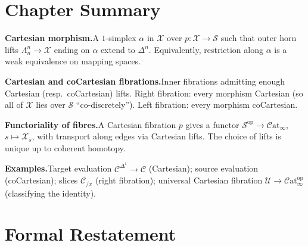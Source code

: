 \section*{Chapter Summary}

\begin{summarybox}
\textbf{Cartesian morphism.}\quad A $1$-simplex $\alpha$ in $\mathcal{X}$
over $p : \mathcal{X} \to \mathcal{S}$ such that outer horn lifts
$\Lambda^n_n \to \mathcal{X}$ ending on $\alpha$ extend to $\Delta^n$.
Equivalently, restriction along $\alpha$ is a weak equivalence on mapping
spaces.

\textbf{Cartesian and coCartesian fibrations.}\quad Inner fibrations
admitting enough Cartesian (resp.\ coCartesian) lifts. Right fibration:
every morphism Cartesian (so all of $\mathcal{X}$ lies over $\mathcal{S}$
``co-discretely''). Left fibration: every morphism coCartesian.

\textbf{Functoriality of fibres.}\quad A Cartesian fibration $p$ gives
a functor $\mathcal{S}^{\mathrm{op}} \to \mathcal{C}\mathrm{at}_\infty$,
$s \mapsto \mathcal{X}_s$, with transport along edges via Cartesian
lifts. The choice of lifts is unique up to coherent homotopy.

\textbf{Examples.}\quad Target evaluation $\mathcal{C}^{\Delta^1} \to
\mathcal{C}$ (Cartesian); source evaluation (coCartesian); slices
$\mathcal{C}_{/x}$ (right fibration); universal Cartesian fibration
$\mathcal{U} \to \mathcal{C}\mathrm{at}_\infty^{\mathrm{op}}$
(classifying the identity).
\end{summarybox}


\section*{Formal Restatement}

